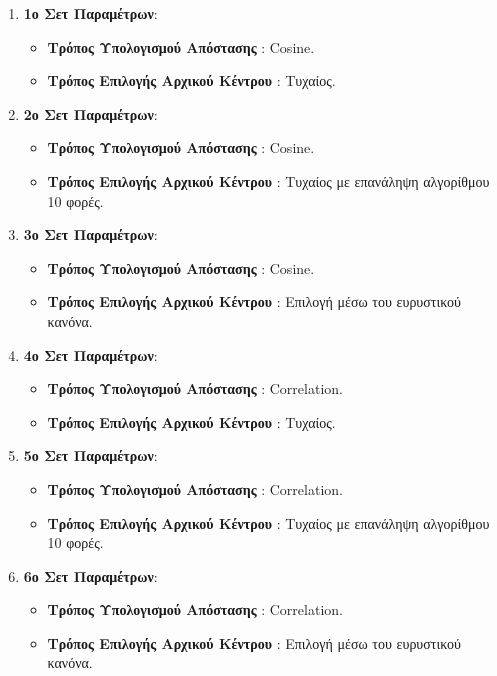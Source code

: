 \begin{enumerate}
    \item \textbf{1ο Σετ Παραμέτρων}:
    \begin{itemize}
        \item \textbf{Τρόπος Υπολογισμού Απόστασης} : Cosine.
        \item \textbf{Τρόπος Επιλογής Αρχικού Κέντρου} : Τυχαίος.
    \end{itemize}
    \item  \textbf{2ο Σετ Παραμέτρων}:
    \begin{itemize}
        \item \textbf{Τρόπος Υπολογισμού Απόστασης} : Cosine.
        \item \textbf{Τρόπος Επιλογής Αρχικού Κέντρου} : Τυχαίος με επανάληψη αλγορίθμου 10 φορές.
    \end{itemize}
    \item  \textbf{3ο Σετ Παραμέτρων}:
        \begin{itemize}
            \item \textbf{Τρόπος Υπολογισμού Απόστασης} : Cosine.
            \item \textbf{Τρόπος Επιλογής Αρχικού Κέντρου} : Επιλογή μέσω του ευρυστικού κανόνα.
        \end{itemize}
    \item  \textbf{4ο Σετ Παραμέτρων}:
        \begin{itemize}
            \item \textbf{Τρόπος Υπολογισμού Απόστασης} : Correlation.
            \item \textbf{Τρόπος Επιλογής Αρχικού Κέντρου} : Τυχαίος.
        \end{itemize}
    \item  \textbf{5ο Σετ Παραμέτρων}:
        \begin{itemize}
            \item \textbf{Τρόπος Υπολογισμού Απόστασης} : Correlation.
            \item \textbf{Τρόπος Επιλογής Αρχικού Κέντρου} : Τυχαίος με επανάληψη αλγορίθμου 10 φορές.
        \end{itemize}
    \item  \textbf{6ο Σετ Παραμέτρων}:
        \begin{itemize}
            \item \textbf{Τρόπος Υπολογισμού Απόστασης} : Correlation.
            \item \textbf{Τρόπος Επιλογής Αρχικού Κέντρου} :  Επιλογή μέσω του ευρυστικού κανόνα.
        \end{itemize}
\end{enumerate}

